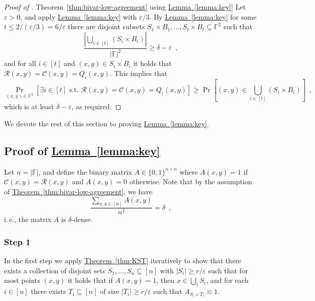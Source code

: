 \documentclass[11pt]{article}
\numberwithin{equation}{section}
\theoremstyle{definition}
\theoremstyle{plain}
\newcommand{\ie}{i.\,e.}
\newcommand{\expref}[2]{\hyperref[#2]{#1~\ref{#2}}}
\theoremstyle{plain}
\newcommand{\colored}{}
\newcommand{\blocklength}{\colored{n}} %
\newcommand{\Field}{\colored{\mathbb F}}
\newcommand{\st}{\colored{\text{ s.t. }}}
\newcommand{\degree}{\colored{r}}
\newcommand{\rowpoly}{\colored{\mathcal R}}
\newcommand{\colpoly}{\colored{\mathcal C}}
\newcommand{\prox}{\colored{\delta}}
\newcommand{\numrect}{\colored{u}}
\newcommand{\eps}{\varepsilon}
\newcommand\abs[1]{\colored{\left|#1\right|}}
\begin{document}
\begin{proof}[Proof of \expref{Theorem}{thm:bivar-low-agreement} using \expref{Lemma}{lemma:key}]
    Let $\eps  > 0$, and apply \expref{Lemma}{lemma:key}
    with $\eps/3$.
    By \expref{Lemma}{lemma:key} for some
    $t \leq {2}/{(\eps/3)} = {6}/{\eps}$
    there are disjoint subsets $S_1 \times B_1,\dots,S_t \times B_t \subseteq \Field^2$
    such that
%
%
    \[{\frac{\abs{\bigcup_{i \in [t]} (S_i \times B_i)}}{\abs{\Field}^2} \geq \prox - \eps}\enspace,
    \]
    and %
    for all $i \in [t]$ and $(x,y) \in S_i \times B_i$ it holds that
    $\rowpoly(x,y) = \colpoly(x,y) = Q_i(x,y)$.  This implies that
    \begin{equation*}
        \Pr_{(x,y) \in \Field^2}[\exists i \in [t] \st \rowpoly(x,y) = \colpoly(x,y)= Q_i(x,y)] \geq
%
  \Pr[(x,y) \in \bigcup_{i \in [t]} (S_i \times B_i)] \enspace,  %
    \end{equation*}
    which is at least $\prox - \eps$, as required.
\end{proof}

We devote the rest of this section to proving \expref{Lemma}{lemma:key}.

\subsection{Proof of \expref{Lemma}{lemma:key}}

    Let $\blocklength = \abs{\Field}$, and define the binary matrix $A \in \{0,1\}^{\blocklength \times \blocklength}$
    where $A(x,y) = 1$ if $\colpoly(x,y) = \rowpoly(x,y)$ and $A(x,y) = 0$ otherwise.
    Note that by the assumption of \expref{Theorem}{thm:bivar-low-agreement}, we have
    \[
      \frac{\sum_{x,y \in [\blocklength]} A(x,y)}{\blocklength^2} = \prox\enspace,
      \]
      \ie, the matrix $A$ is $\prox$-dense.
\subsubsection{Step 1}


    In the first step we apply \expref{Theorem}{thm:KST} iteratively to show that there exists a collection of disjoint sets $S_1,\dots,S_{\numrect} \subseteq [\blocklength]$
    with $\abs{S_i} \geq {\degree}/{\eps}$ such that for most points $(x,y)$ it holds that if $A(x,y) = 1$,
%
%
%
    then $x \in \bigcup_i S_i$,             %
    and for each $i \in [\numrect]$ there exists $T_i \subseteq [\blocklength]$ of size $\abs{T_i} \geq {\degree}/{\eps}$ such that $A_{S_i \times T_i} \equiv 1$.
\end{document}
